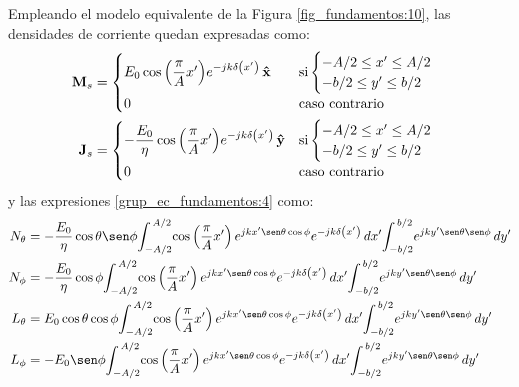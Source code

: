 Empleando el modelo equivalente de la Figura \ref{fig_fundamentos:10}, las densidades de corriente quedan expresadas como:
\begin{align}
\mathbf{M}_s &=
\begin{cases}
\makebox[0pt][l]{$E_0\cos\left(\dfrac{\pi}{A}x'\right)\!e^{-jk\delta\left(x'\right)}\,\versor{x}$}\hphantom{-\dfrac{E_0}{\eta}\cos\left(\dfrac{\pi}{A}x'\right)\!e^{-jk\delta\left(x'\right)}\,\versor{y}} &\text{si}
\begin{cases} 
-A/2 \leq x' \leq A/2\\
-b/2 \leq y' \leq b/2
\end{cases}\\
0 & \text{caso contrario}
\end{cases}
\label{ec_apB:106}\\
\mathbf{J}_s &= 
\begin{cases} 
-\dfrac{E_0}{\eta}\cos\left(\dfrac{\pi}{A}x'\right)\!e^{-jk\delta\left(x'\right)}\,\versor{y} &\text{si}
\begin{cases} 
-A/2 \leq x' \leq A/2\\
-b/2 \leq y' \leq b/2
\end{cases}\\
0  &\text{caso contrario}
\end{cases}
\label{ec_apB:107}
\end{align}
y las expresiones \eqref{grup_ec_fundamentos:4} como:
\begin{subequations}
\label{grup_ec_apB:20}
\begin{align}
N_{\theta} &= -\frac{E_0}{\eta}\cos\theta\sen\phi\!\int_{-A/2}^{\,A/2}\!\cos\left(\dfrac{\pi}{A}x'\right)e^{jkx'\sen\theta\cos\phi}e^{-jk\delta\left(x'\right)}\,dx'\!\int_{-b/2}^{\,b/2}\!e^{jky'\sen\theta\sen\phi}\,dy'
\label{ec_apB:108}\\
N_{\phi} &= -\frac{E_0}{\eta}\cos\phi\!\int_{-A/2}^{\,A/2}\!\cos\left(\dfrac{\pi}{A}x'\right)e^{jkx'\sen\theta\cos\phi}e^{-jk\delta\left(x'\right)}\,dx'\!\int_{-b/2}^{\,b/2}\!e^{jky'\sen\theta\sen\phi}\,dy'
\label{ec_apB:109}\\
L_{\theta}  &= E_0\cos\theta\cos\phi\!\int_{-A/2}^{\,A/2}\!\cos\left(\dfrac{\pi}{A}x'\right)e^{jkx'\sen\theta\cos\phi}e^{-jk\delta\left(x'\right)}\,dx'\!\int_{-b/2}^{\,b/2}\!e^{jky'\sen\theta\sen\phi}\,dy'
\label{ec_apB:110}\\
L_{\phi} &= -E_0\sen\phi\!\int_{-A/2}^{\,A/2}\!\cos\left(\dfrac{\pi}{A}x'\right)e^{jkx'\sen\theta\cos\phi}e^{-jk\delta\left(x'\right)}\,dx'\!\int_{-b/2}^{\,b/2}\!e^{jky'\sen\theta\sen\phi}\,dy'
\label{ec_apB:111}
\end{align}
\end{subequations}
